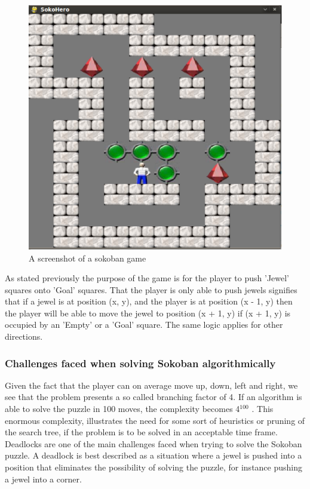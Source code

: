 \begin{figure}[ht]
\centering
\includegraphics[scale=0.25]{images/sokohero.eps}
\caption{A screenshot of a sokoban game}
\label{fig:sokohero}
\end{figure}


As stated previously the purpose of the game is for the player to push 'Jewel' squares onto 'Goal' squares. That the player is only able to push jewels signifies that if a jewel is at position (x, y), and the player is at position (x - 1, y) then the player will be able to move the jewel to position (x + 1, y) if (x + 1, y) is occupied by an 'Empty' or a 'Goal' square. The same logic applies for other directions.
 
\subsubsection{Challenges faced when solving Sokoban algorithmically}
Given the fact that the player can on average move up, down, left and right, we see that the problem presents a so called branching factor of 4. If an algorithm is able to solve the puzzle in 100 moves, the complexity becomes 4$^{100}$ . 
This enormous complexity, illustrates the need for some sort of heuristics or pruning of the search tree, if the problem is to be solved in an acceptable time frame.
Deadlocks are one of the main challenges faced when trying to solve the Sokoban puzzle. A deadlock is best described as a situation where a jewel is pushed into a position that eliminates the possibility of solving the puzzle, for instance pushing a jewel into a corner. 

